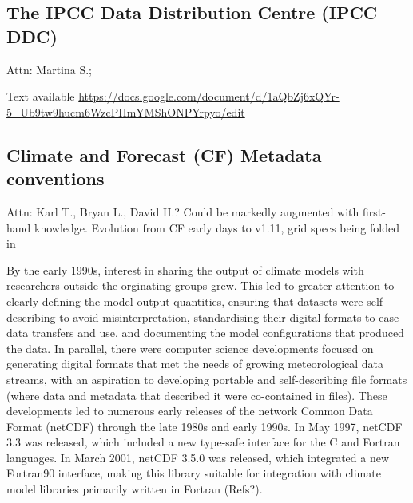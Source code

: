 \documentclass[gmd, preprint]{copernicus}
\newcommand{\mycomment}[1]{}
\def\cred#1{{\color{red}#1}}
\begin{document}
\subsection{The IPCC Data Distribution Centre (IPCC DDC)}
\label{sec:IPCC-DDC}
\cred{Attn: Martina S.; \citep{stockhause_quality_2012,stockhause_cmip6_2017,stockhause_twenty-five_2022}}

Text available \url{https://docs.google.com/document/d/1aQbZj6xQYr-5_Ub9tw9hucm6WzcPIImYMShONPYrpyo/edit} 


\subsection{Climate and Forecast (CF) Metadata conventions}
\label{sec:CFConventions}
\cred{Attn: Karl T., Bryan L., David H.? Could be markedly augmented with first-hand knowledge. Evolution from CF early days to v1.11, grid specs being folded in}

By the early 1990s, interest in sharing the output of climate models with researchers outside the orginating groups grew. This led to greater attention to clearly defining the model output quantities, ensuring that datasets were self-describing to avoid misinterpretation, standardising their digital formats to ease data transfers and use, and documenting the model configurations that produced the data. In parallel, there were computer science developments focused on generating digital formats that met the needs of growing meteorological data streams, with an aspiration to developing portable and self-describing file formats (where data and metadata that described it were co-contained in files). These developments led to numerous early releases of the network Common Data Format (netCDF) through the late 1980s and early 1990s. In May 1997, netCDF 3.3 was released, which included a new type-safe interface for the C and Fortran languages. In March 2001, netCDF 3.5.0 was released, which integrated a new Fortran90 interface, making this library suitable for integration with climate model libraries primarily written in Fortran \cred{(Refs?)}.
\mycomment{
https://docs.unidata.ucar.edu/nug/2.0-draft/netcdf_history.html
}
\end{document}
